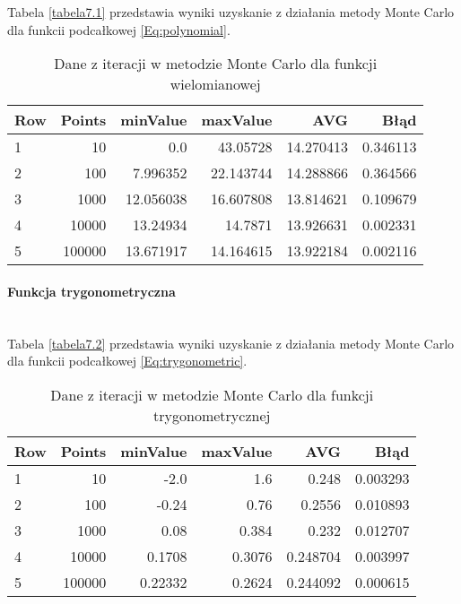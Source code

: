 \documentclass[12pt,twoside]{article}
\begin{document}
Tabela \eqref{tabela7.1} przedstawia wyniki uzyskanie z działania metody Monte Carlo dla funkcii podcałkowej \eqref{Eq:polynomial}.

\begin{table}[H]
\centering 
\caption{Dane z iteracji w metodzie Monte Carlo dla funkcji wielomianowej}
\label{tabela7.1}
\begin{tabular}{lrrrrr}
\toprule
{Row} &  Points &  minValue &  maxValue &       AVG &      Błąd \\
\midrule
1  &     10 & 0.0 &   43.05728 & 14.270413 & 0.346113 \\
2  &     100 & 7.996352 &  22.143744 & 14.288866 & 0.364566 \\
3  &     1000 & 12.056038 &   16.607808 & 13.814621 & 0.109679 \\
4  &     10000 & 13.24934 &  14.7871 & 13.926631 & 0.002331 \\
5  &     100000 & 13.671917 &  14.164615 & 13.922184& 0.002116 \\
\bottomrule
\end{tabular}
\end{table}

\paragraph{Funkcja trygonometryczna}\mbox{} \\

Tabela \eqref{tabela7.2} przedstawia wyniki uzyskanie z działania metody Monte Carlo dla funkcii podcałkowej \eqref{Eq:trygonometric}.

\begin{table}[H]
\centering 
\caption{Dane z iteracji w metodzie Monte Carlo dla funkcji trygonometrycznej}
\label{tabela7.2}
\begin{tabular}{lrrrrr}
\toprule
{Row} &  Points &  minValue &  maxValue &       AVG &      Błąd \\
\midrule
1  &     10 & -2.0 &   1.6 & 0.248 & 0.003293 \\
2  &     100 & -0.24 &  0.76 & 0.2556 & 0.010893  \\
3  &     1000 & 0.08 &   0.384 & 0.232& 0.012707 \\
4  &     10000 & 0.1708 &  0.3076 & 0.248704 & 0.003997 \\
5  &     100000 & 0.22332 & 0.2624 & 0.244092 & 0.000615  \\
\bottomrule
\end{tabular}
\end{table}
\end{document}
